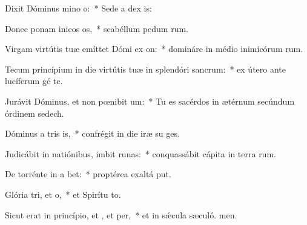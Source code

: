 \item Dixit Dóminus mino o:~* Sede a dex is:
\item Donec ponam inicos os,~* scabéllum pedum rum.
\item Virgam virtútis tuæ emíttet Dómi ex on:~* domináre in médio inimicórum rum.
\item Tecum princípium in die virtútis tuæ in splendóri sancrum:~* ex útero ante lucíferum gé te.
\item Jurávit Dóminus, et non pœnibit um:~* Tu es sacérdos in ætérnum secúndum órdinem sedech.
\item Dóminus a tris is,~* confrégit in die iræ su ges.
\item Judicábit in natiónibus, imbit runas:~* conquassábit cápita in terra rum.
\item De torrénte in a bet:~* proptérea exaltá put.
\item Glória tri, et o,~* et Spirítu to.
\item Sicut erat in princípio, et , et per,~* et in sǽcula sæculó. men.
